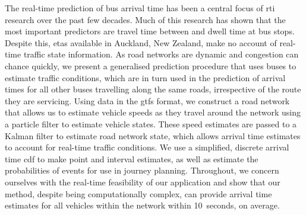 The real-time prediction of bus arrival time has been a central focus of \gls{rti} research over the past few decades. Much of this research has shown that the most important predictors are travel time between and dwell time at bus stops. Despite this, \glspl{eta} available in Auckland, New Zealand, make no account of real-time traffic state information. As road networks are dynamic and congestion can chance quickly, we present a generalised prediction procedure that uses buses to estimate traffic conditions, which are in turn used in the prediction of arrival times for all other buses travelling along the same roads, irrespective of the route they are servicing. Using data in the \gls{gtfs} format, we construct a road network that allows us to estimate vehicle speeds as they travel around the network using a particle filter to estimate vehicle states. These speed estimates are passed to a Kalman filter to estimate road network state, which allows arrival time estimates to account for real-time traffic conditions. We use a simplified, discrete arrival time \gls{cdf} to make point and interval estimates, as well as estimate the probabilities of events for use in journey planning. Throughout, we concern ourselves with the real-time feasibility of our application and show that our method, despite being computationally complex, can provide arrival time estimates for all vehicles within the network within 10~seconds, on average.
